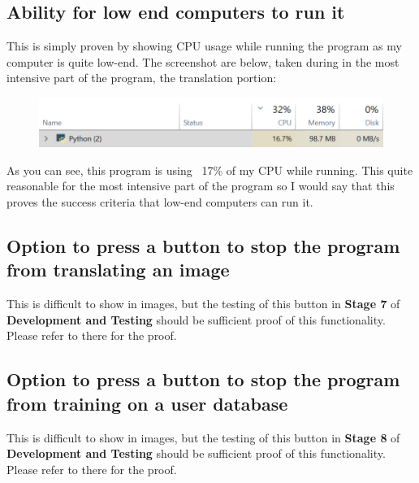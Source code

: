 \documentclass{report}
\begin{document}
\subsection{Ability for low end computers to run it}
This is simply proven by showing CPU usage while running the program as my computer is quite low-end. The screenshot are below, taken during in the most intensive part of the program, the translation portion:
\begin{figure}[H]
    \centering
    \includegraphics[width=5in]{Images/Evaluation/Success Criteria Proof/CPU usage screenshot.png}
\end{figure}
\noindent As you can see, this program is using ~17\% of my CPU while running. This quite reasonable for the most intensive part of the program so I would say that this proves the success criteria that low-end computers can run it.
\subsection{Option to press a button to stop the program from translating an image}
This is difficult to show in images, but the testing of this button in \textbf{Stage 7} of \textbf{Development and Testing} should be sufficient proof of this functionality. Please refer to there for the proof.
\subsection{Option to press a button to stop the program from training on a user database}
This is difficult to show in images, but the testing of this button in \textbf{Stage 8} of \textbf{Development and Testing} should be sufficient proof of this functionality. Please refer to there for the proof.
\end{document}
